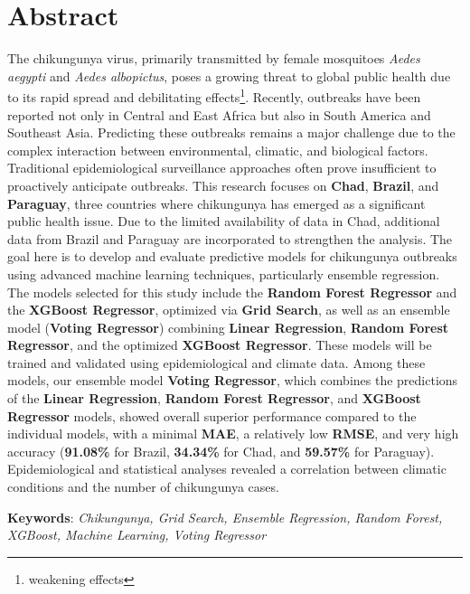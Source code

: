 \chapter*{Abstract}

\renewcommand{\abstractnamefont}{\normalfont\Large\bfseries}

\hskip7mm
%

\begin{spacing}{1.3}
	The chikungunya virus, primarily transmitted by female mosquitoes \textit{Aedes aegypti} and \textit{Aedes albopictus}, poses a growing threat to global public health due to its rapid spread and debilitating effects\footnote{weakening effects}. Recently, outbreaks have been reported not only in Central and East Africa but also in South America and Southeast Asia. Predicting these outbreaks remains a major challenge due to the complex interaction between environmental, climatic, and biological factors. Traditional epidemiological surveillance approaches often prove insufficient to proactively anticipate outbreaks. This research focuses on \textbf{Chad}, \textbf{Brazil}, and \textbf{Paraguay}, three countries where chikungunya has emerged as a significant public health issue. Due to the limited availability of data in Chad, additional data from Brazil and Paraguay are incorporated to strengthen the analysis. The goal here is to develop and evaluate predictive models for chikungunya outbreaks using advanced machine learning techniques, particularly ensemble regression. The models selected for this study include the \textbf{Random Forest Regressor} and the \textbf{XGBoost Regressor}, optimized via \textbf{Grid Search}, as well as an ensemble model (\textbf{Voting Regressor}) combining \textbf{Linear Regression}, \textbf{Random Forest Regressor}, and the optimized \textbf{XGBoost Regressor}. These models will be trained and validated using epidemiological and climate data. Among these models, our ensemble model \textbf{Voting Regressor}, which combines the predictions of the \textbf{Linear Regression}, \textbf{Random Forest Regressor}, and \textbf{XGBoost Regressor} models, showed overall superior performance compared to the individual models, with a minimal \textbf{MAE}, a relatively low \textbf{RMSE}, and very high accuracy (\textbf{91.08\%} for Brazil, \textbf{34.34\%} for Chad, and \textbf{59.57\%} for Paraguay). Epidemiological and statistical analyses revealed a correlation between climatic conditions and the number of chikungunya cases.
	
	\textbf{Keywords}: \textit{Chikungunya, Grid Search, Ensemble Regression, Random Forest, XGBoost, Machine Learning, Voting Regressor}
	
\end{spacing}
